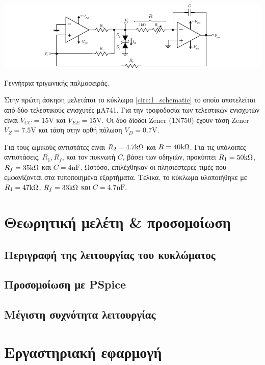 \begin{center}
	\begin{circuitfig}[H]
		\includegraphics[width=14cm]{circuits/micro3_lab1.pdf}
		\caption{Γεννήτρια τριγωνικής παλμοσειράς.}
		\label{circ:1_schematic}
	\end{circuitfig}
\end{center}
\vspace*{-1cm}

Στην πρώτη άσκηση μελετάται το κύκλωμα \ref{circ:1_schematic} το οποίο αποτελείται από δύο τελεστικούς ενισχυτές μΑ741. Για την τροφοδοσία των τελεστικών ενισχυτών είναι $V_{CC}=15\unit{\volt}$ και $V_{EE}=15\unit{\volt}$. Οι δύο δίοδοι Zener (1N750) έχουν τάση Zener $V_Z=7.5\unit{\volt}$ και τάση στην ορθή πόλωση $V_D=0.7\unit{\volt}$.\par
Για τους ωμικούς αντιστάτες είναι $R_2=4.7\kohm$ και $R=40\kohm$. Για τις υπόλοιπες αντιστάσεις, $R_1,R_f$, και τον πυκνωτή $C$, βάσει των οδηγιών, προκύπτει $R_1=50\kohm$, $R_f=35\kohm$ και $C=4\unit{\nano\farad}$. Ωστόσο, επιλέχθηκαν οι πλησιέστερες τιμές που εμφανίζονται στα τυποποιημένα εξαρτήματα. Τελικα, το κύκλωμα υλοποιήθηκε με $R_1=47\kohm$, $R_f=33\kohm$ και $C=4.7\unit{\nano\farad}$.\par

\section{Θεωρητική μελέτη \& προσομοίωση}

	\subsection{Περιγραφή της λειτουργίας του κυκλώματος}
		

	\subsection{Προσομοίωση με PSpice}
		

	\subsection{Μέγιστη συχνότητα λειτουργίας}
		


\section{Εργαστηριακή εφαρμογή}
	